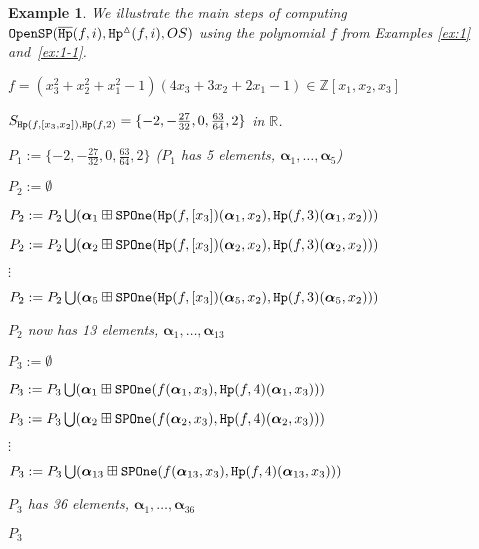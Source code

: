 \documentclass[amsthm]{elsart}
\def  \Hproj {{\tt Hp}}
\def \RR {{\mathbb R}}
\def \ZZ {{\mathbb Z}}
\newcommand{\va}{\bm{\alpha}}
\newtheorem{ex}{Example}   \renewcommand{\algorithmicrequire}{\textsf{Input:}}
\begin{document}
\begin{ex}\label{ex:1-2}
We illustrate the main steps of computing ${\tt OpenSP}(\overline{\Hproj}(f,i),{\Hproj^{\vartriangle}}(f,i),OS)$
using the polynomial $f$ from Examples \ref{ex:1} and~\ref{ex:1-1}. \medskip
\begin{description}[leftmargin=3em,style=nextline,itemsep=0.5em]
\item[\sf In:]   $f=(x_3^2+x_2^2+x_1^2-1)(4x_3+3x_2+2x_1-1)\in \ZZ[x_1, x_2,x_3]$
\item[]          $S_{\Hproj(f,[x_3,x_2]),\Hproj(f,2)}=\{-2,-\frac{27}{32},0,\frac{63}{64},2\}$ in $\RR$.

\item[\sf 1:] $P_1 :=\{-2,-\frac{27}{32},0,\frac{63}{64},2\}$
 \;\;\;\;\;\;\;\;($P_1$ has 5 elements, $\va_1,\ldots, \va_{5}$)

\item[\sf 3:] $P_2 := \emptyset$
\item[\sf 5:] $P_2:=P_2\bigcup (\va_1\boxplus {\tt SPOne}(\Hproj(f,[x_3])(\va_1,x_2),\Hproj(f,3)(\va_1,x_2)))$
\item[]       $P_2:=P_2\bigcup (\va_2\boxplus {\tt SPOne}(\Hproj(f,[x_3])(\va_2,x_2),\Hproj(f,3)(\va_2,x_2)))$
\item[]       $\vdots$
\item[]       $P_2:=P_2\bigcup (\va_5\boxplus {\tt SPOne}(\Hproj(f,[x_3])(\va_5,x_2),\Hproj(f,3)(\va_5,x_2)))$
\item[]       $P_2$ now has 13 elements, $\va_1,\ldots, \va_{13}$
\item[\sf 3:] $P_3 := \emptyset$
\item[\sf 5:] $P_3:=P_3\bigcup (\va_1\boxplus {\tt SPOne}(f(\va_1,x_3),\Hproj(f,4)(\va_1,x_3)))$
\item[]       $P_3:=P_3\bigcup (\va_2\boxplus {\tt SPOne}(f(\va_2,x_3),\Hproj(f,4)(\va_2,x_3)))$
\item[]       $\vdots$
\item[]       $P_3:=P_3\bigcup (\va_{13}\boxplus {\tt SPOne}(f(\va_{13},x_3),\Hproj(f,4)(\va_{13},x_3)))$
\item[]       $P_3$ has 36 elements, $\va_1,\ldots, \va_{36}$
\item[\sf Out]       $P_3$
\end{description}
\end{ex}
\end{document}
